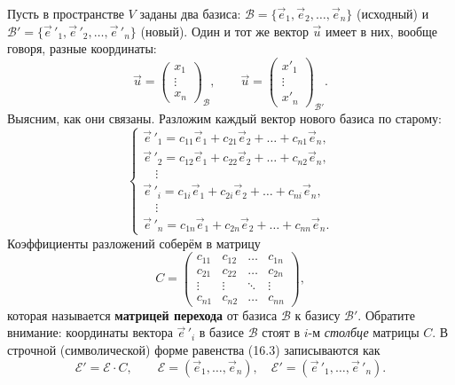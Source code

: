 \documentclass[12pt,a4paper]{article}
\begin{document}
Пусть в пространстве $V$ заданы два базиса: $\mathcal{B} =
\{\vec{e}_1, \vec{e}_2, \dots, \vec{e}_n\}$ (исходный) и $\mathcal{B}'
= \{\vec{e}\,'_1, \vec{e}\,'_2, \dots, \vec{e}\,'_n\}$ (новый). Один и
тот же вектор $\vec{u}$ имеет в них, вообще говоря, разные координаты:
\[
  \vec{u} =
  \begin{pmatrix} x_1 \\ \vdots \\ x_n
  \end{pmatrix}_{\mathcal{B}},
  \qquad
  \vec{u} =
  \begin{pmatrix} x'_1 \\ \vdots \\ x'_n
  \end{pmatrix}_{\mathcal{B}'}.
\]
Выясним, как они связаны. Разложим каждый вектор нового базиса по
старому:
\begin{equation}
  \begin{cases}
    \vec{e}\,'_1 = c_{11}\vec{e}_1 + c_{21}\vec{e}_2 + \dots +
    c_{n1}\vec{e}_n, \\
    \vec{e}\,'_2 = c_{12}\vec{e}_1 + c_{22}\vec{e}_2 + \dots +
    c_{n2}\vec{e}_n, \\
    \quad \vdots \\
    \vec{e}\,'_i = c_{1i}\vec{e}_1 + c_{2i}\vec{e}_2 + \dots +
    c_{ni}\vec{e}_n, \\
    \quad \vdots \\
    \vec{e}\,'_n = c_{1n}\vec{e}_1 + c_{2n}\vec{e}_2 + \dots +
    c_{nn}\vec{e}_n.
  \end{cases}
  \tag{16.3}
\end{equation}
Коэффициенты разложений соберём в матрицу
\[
  C =
  \begin{pmatrix}
    c_{11} & c_{12} & \dots & c_{1n} \\
    c_{21} & c_{22} & \dots & c_{2n} \\
    \vdots & \vdots & \ddots & \vdots \\
    c_{n1} & c_{n2} & \dots & c_{nn}
  \end{pmatrix},
\]
которая называется \textbf{матрицей перехода} от базиса
$\mathcal{B}$ к базису $\mathcal{B}'$. Обратите внимание: координаты
вектора $\vec{e}\,'_i$ в базисе $\mathcal{B}$ стоят в $i$-м
\emph{столбце} матрицы $C$. В строчной (символической) форме равенства
(16.3) записываются как
\begin{equation}
  \mathcal{E}' = \mathcal{E} \cdot C, \qquad
  \mathcal{E} = (\vec{e}_1, \dots, \vec{e}_n), \quad
  \mathcal{E}' = (\vec{e}\,'_1, \dots, \vec{e}\,'_n).
  \tag{16.4}
\end{equation}
\end{document}
